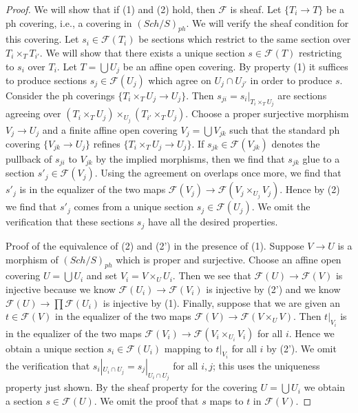 \documentclass[10pt,a4paper]{amsart}
\theoremstyle{plain}
\theoremstyle{definition}
\theoremstyle{remark}
\numberwithin{equation}{subsection}
\def\Sch{\mathit{Sch}}
\begin{document}
\begin{proof}
We will show that if (1) and (2) hold, then $\mathcal{F}$ is sheaf.
Let $\{T_i \to T\}$ be a ph covering, i.e., a covering in $(\Sch/S)_{ph}$.
We will verify the sheaf condition for this covering.
Let $s_i \in \mathcal{F}(T_i)$ be sections which restrict to the same
section over $T_i \times_T T_{i'}$. We will show that there exists a
unique section $s \in \mathcal{F}(T)$ restricting to $s_i$ over $T_i$.
Let $T = \bigcup U_j$ be an affine open covering.
By property (1) it suffices to produce sections $s_j \in \mathcal{F}(U_j)$
which agree on $U_j \cap U_{j'}$ in order to produce $s$.
Consider the ph coverings $\{T_i \times_T U_j \to U_j\}$.
Then $s_{ji} = s_i|_{T_i \times_T U_j}$ are sections agreeing
over $(T_i \times_T U_j) \times_{U_j} (T_{i'} \times_T U_j)$.
Choose a proper surjective morphism $V_j \to U_j$ and a finite affine
open covering $V_j = \bigcup V_{jk}$ such that the standard ph covering
$\{V_{jk} \to U_j\}$ refines $\{T_i \times_T U_j \to U_j\}$.
If $s_{jk} \in \mathcal{F}(V_{jk})$
denotes the pullback of $s_{ji}$ to $V_{jk}$ by the
implied morphisms, then we find that $s_{jk}$ glue to a section
$s'_j \in \mathcal{F}(V_j)$. Using the agreement on overlaps
once more, we find that $s'_j$ is in the equalizer of the two
maps $\mathcal{F}(V_j) \to \mathcal{F}(V_j \times_{U_j} V_j)$.
Hence by (2) we find that $s'_j$ comes from a unique section
$s_j \in \mathcal{F}(U_j)$. We omit the verification that these
sections $s_j$ have all the desired properties.

\medskip\noindent
Proof of the equivalence of (2) and (2') in the presence of (1).
Suppose $V \to U$ is a morphism of $(\Sch/S)_{ph}$ which is
proper and surjective. Choose an
affine open covering $U = \bigcup U_i$ and set $V_i = V \times_U U_i$.
Then we see that $\mathcal{F}(U) \to \mathcal{F}(V)$
is injective because we know $\mathcal{F}(U_i) \to \mathcal{F}(V_i)$
is injective by (2') and we know $\mathcal{F}(U) \to \prod \mathcal{F}(U_i)$
is injective by (1). Finally, suppose that we are given an
$t \in \mathcal{F}(V)$ in the equalizer of the two maps
$\mathcal{F}(V) \to \mathcal{F}(V \times_U V)$.
Then $t|_{V_i}$ is in the equalizer of the two maps
$\mathcal{F}(V_i) \to \mathcal{F}(V_i \times_{U_i} V_i)$
for all $i$. Hence we obtain a unique section $s_i \in \mathcal{F}(U_i)$
mapping to $t|_{V_i}$ for all $i$ by (2').
We omit the verification that $s_i|_{U_i \cap U_j} = s_j|_{U_i \cap U_j}$
for all $i, j$; this uses the uniqueness property just shown.
By the sheaf property for the covering $U = \bigcup U_i$ we obtain
a section $s \in \mathcal{F}(U)$. We omit the proof that $s$
maps to $t$ in $\mathcal{F}(V)$.
\end{proof}
\end{document}
